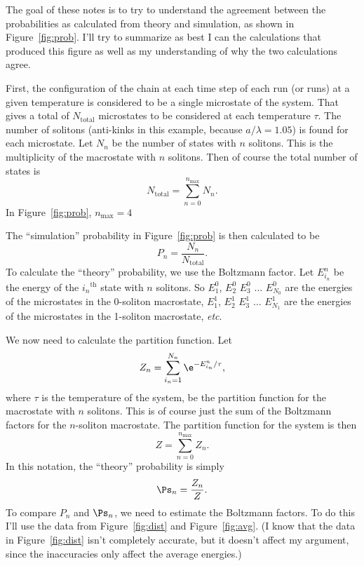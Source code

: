 \documentclass[11pt]{article}
\begin{document}
The goal of these notes is to try to understand the agreement between the probabilities as calculated from theory and simulation, as shown in Figure~\ref{fig:prob}. I'll try to summarize as best I can the calculations that produced this figure as well as my understanding of why the two calculations agree.


First, the configuration of the chain at each time step of each run (or runs) at a given temperature is considered to be a single microstate of the system. That gives a total of $N_\text{total}$ microstates to be considered at each temperature $\tau$. The number of solitons (anti-kinks in this example, because $a/\lambda=1.05$) is found for each microstate. Let $N_n$ be the number of states with $n$ solitons. This is the multiplicity of the macrostate with $n$ solitons. Then of course the total number of states is
\begin{equation}
N_\text{total}=\sum_{n=0}^{n_\text{max}} N_n.
\end{equation}
In Figure~\ref{fig:prob}, $n_\text{max}=4$

The ``simulation'' probability in Figure~\ref{fig:prob} is then calculated to be
\begin{equation}
P_n = \frac{N_n}{N_\text{total}}.
\end{equation}
To calculate the ``theory'' probability, we use the Boltzmann factor. Let $E_{i_n}^n$ be the energy of the ${i_n}^{\text{th}}$ state with $n$ solitons. So $E_1^0$, $E_2^0$ $E_3^0$ $\ldots$ $E_{N_0}^0$ are the energies of the microstates in the 0-soliton macrostate, $E_1^1$, $E_2^1$ $E_3^1$ $\ldots$ $E_{N_1}^1$ are the energies of the microstates in the 1-soliton macrostate, \textit{etc}.

We now need to calculate the partition function. Let
\begin{equation}
Z_n=\sum_{i_n=1}^{N_n}\e^{-E_{i_n}^n/\tau},
\end{equation}
where $\tau$ is the temperature of the system, be the partition function for the macrostate with $n$ solitons. This is of course just the sum of the Boltzmann factors for the $n$-soliton macrostate. The partition function for the system is then
\begin{equation}
Z=\sum_{n=0}^{n_\text{max}} Z_n.
\end{equation}
In this notation, the ``theory'' probability is simply
\begin{equation}
\Ps_n=\frac{Z_n}{Z}.
\end{equation}
To compare $P_n$ and $\Ps_n$, we need to estimate the Boltzmann factors. To do this I'll use the data from Figure~\ref{fig:dist} and Figure~\ref{fig:avg}. (I know that the data in Figure~\ref{fig:dist} isn't completely accurate, but it doesn't affect my argument, since the inaccuracies only affect the average energies.)
\end{document}
